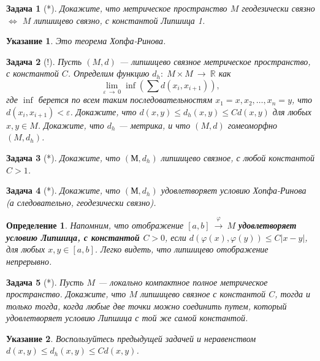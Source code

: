 \documentclass[12pt]{book}
\newcommand{\arrow}{{\:\longrightarrow\:}}
\renewcommand{\phi}{\varphi}
\renewcommand{\epsilon}{\varepsilon}
\def\R{{\mathbb R}}
\theoremstyle{upshape}
\newtheorem{zadacha}{Задача}[chapter]
\theoremstyle{generic}
\newtheorem{opredelenie}[teorema]{Определение}
\theoremstyle{upshapenonumber}
\newtheorem{ukazanie}{Указание}[section]
\newcommand{\следствие}{%
     \refstepcounter{teorema}
     {\noindent\bf Следствие \thechapter.\arabic{teorema}:\ }}
\newcommand{\пример}{%
     \refstepcounter{teorema}
     {\noindent\bf Пример \thechapter.\arabic{teorema}:\ }}
\newcommand{\лемма}{%
     \refstepcounter{teorema}
     {\noindent\bf Лемма \thechapter.\arabic{teorema}:\ }}
\newcommand{\теорема}{%
     \refstepcounter{teorema}
     {\noindent\bf Теорема \thechapter.\arabic{teorema}:\ }}
\newcommand{\утверждение}{%
     \refstepcounter{teorema}
     {\noindent\bf Утверждение \thechapter.\arabic{teorema}:\ }}
\begin{document}
{\begin{zadacha}[*]
Докажите, что метрическое пространство
$M$ геодезически связно $\Leftrightarrow$ 
$M$ липшицево связно, с константой Липшица 1.
\end{zadacha}

\begin{ukazanie}
Это теорема Хопфа-Ринова.
\end{ukazanie}

\begin{zadacha}[!]
Пусть $(M, d)$ --- липшицево связное метрическое пространство,
с константой $C$. Определим функцию $d_h:\; M\times M \arrow \R$ как
\[
\lim\limits_{\epsilon\arrow 0} \inf\left(\sum d(x_i, x_{i+1})\right),
\]
где $\inf$ берется по всем таким последовательностям 
$x_1=x, x_2, \dots, x_n=y$, что $d(x_i, x_{i+1})< \epsilon$.
Докажите, что
$d(x, y) \leq d_h(x,y) \leq Cd(x,y)$
для любых $x, y \in M$. Докажите,
что $d_h$ --- метрика, и что $(M, d)$ гомеоморфно
$(M, d_h)$.
\end{zadacha}

\begin{zadacha}[*]
Докажите, что 
$(М, d_h)$ липшицево связное, с любой константой
$C>1$. 
\end{zadacha}

\begin{zadacha}[*]
Докажите, что $(М, d_h)$
удовлетворяет условию Хопфа-Ринова (а следовательно,
геодезически связно).
\end{zadacha}

\begin{opredelenie}
Напомним, что отображение $[a,b]\stackrel\phi\arrow M$ 
{\bf удовлетворяет условию Липшица, с константой $C>0$},
если $d(\phi(x),\phi(y)) \leq C|x-y|$, для любых
$x, y\in [a,b]$. Легко видеть, что липшицево 
отображение непрерывно.
\end{opredelenie}

\begin{zadacha}[*]
Пусть $M$ --- локально компактное полное метрическое пространство.
Докажите, что $M$ липшицево связное с константой $C$,
тогда и только тогда,  когда любые две точки можно 
соединить путем, который удовлетворяет условию Липшица
с той же самой константой. 
\end{zadacha}

\begin{ukazanie} 
Воспользуйтесь предыдущей задачей и неравенством
$d(x, y) \leq d_h(x,y) \leq Cd(x,y)$.
\end{ukazanie}

}
\end{document}
